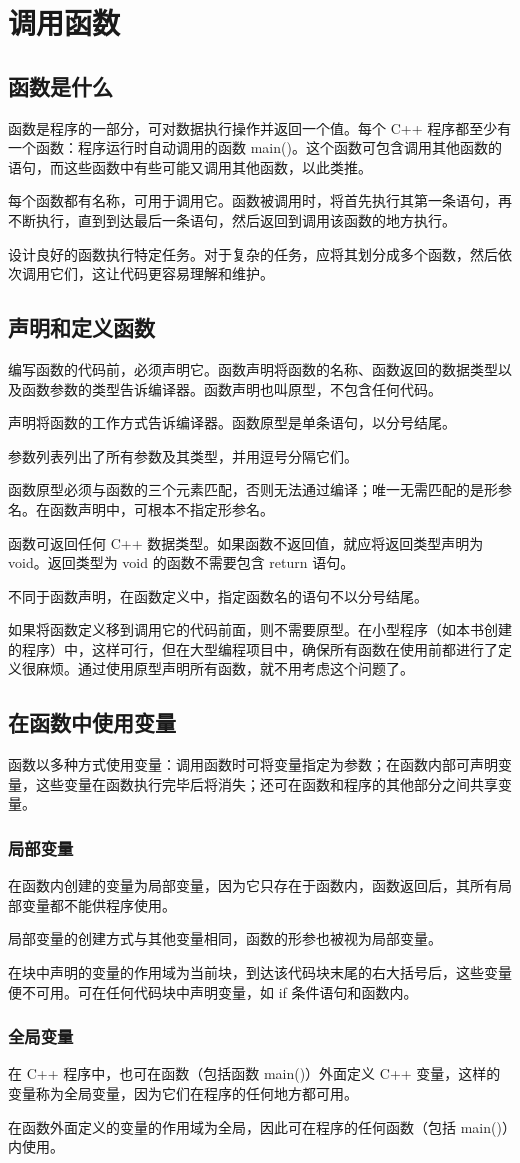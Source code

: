 \chapter{调用函数}
\section{函数是什么}
函数是程序的一部分，可对数据执行操作并返回一个值。每个 C++ 程序都至少有一个函数：程序运行时自动调用的函数 main()。这个函数可包含调用其他函数的语句，而这些函数中有些可能又调用其他函数，以此类推。

每个函数都有名称，可用于调用它。函数被调用时，将首先执行其第一条语句，再不断执行，直到到达最后一条语句，然后返回到调用该函数的地方执行。

设计良好的函数执行特定任务。对于复杂的任务，应将其划分成多个函数，然后依次调用它们，这让代码更容易理解和维护。
\section{声明和定义函数}
编写函数的代码前，必须声明它。函数声明将函数的名称、函数返回的数据类型以及函数参数的类型告诉编译器。函数声明也叫原型，不包含任何代码。

声明将函数的工作方式告诉编译器。函数原型是单条语句，以分号结尾。

参数列表列出了所有参数及其类型，并用逗号分隔它们。

函数原型必须与函数的三个元素匹配，否则无法通过编译；唯一无需匹配的是形参名。在函数声明中，可根本不指定形参名。

函数可返回任何 C++ 数据类型。如果函数不返回值，就应将返回类型声明为 void。返回类型为 void 的函数不需要包含 return 语句。

不同于函数声明，在函数定义中，指定函数名的语句不以分号结尾。

\begin{tcolorbox}
    如果将函数定义移到调用它的代码前面，则不需要原型。在小型程序（如本书创建的程序）中，这样可行，但在大型编程项目中，确保所有函数在使用前都进行了定义很麻烦。通过使用原型声明所有函数，就不用考虑这个问题了。
\end{tcolorbox}
\section{在函数中使用变量}
函数以多种方式使用变量：调用函数时可将变量指定为参数；在函数内部可声明变量，这些变量在函数执行完毕后将消失；还可在函数和程序的其他部分之间共享变量。
\subsection*{局部变量}
在函数内创建的变量为局部变量，因为它只存在于函数内，函数返回后，其所有局部变量都不能供程序使用。

局部变量的创建方式与其他变量相同，函数的形参也被视为局部变量。

在块中声明的变量的作用域为当前块，到达该代码块末尾的右大括号后，这些变量便不可用。可在任何代码块中声明变量，如 if 条件语句和函数内。
\subsection*{全局变量}
在 C++ 程序中，也可在函数（包括函数 main()）外面定义 C++ 变量，这样的变量称为全局变量，因为它们在程序的任何地方都可用。

在函数外面定义的变量的作用域为全局，因此可在程序的任何函数（包括 main()）内使用。
